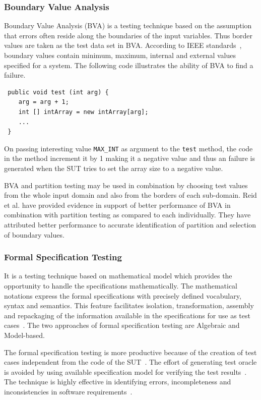 \subsubsection{Boundary Value Analysis}
Boundary Value Analysis (BVA) is a testing technique based on the assumption that errors often reside along the boundaries of the input variables. Thus border values are taken as the test data set in BVA. According to IEEE standards~\cite{radatz1990ieee}, boundary values contain minimum, maximum, internal and external values specified for a system.
The following code illustrates the ability of BVA to find a failure. 
\bigskip
\begin{lstlisting}
 public void test (int arg) {
	arg = arg + 1;
	int [] intArray = new intArray[arg];
	...
 }
\end{lstlisting}
\bigskip
On passing interesting value \verb+MAX_INT+ as argument to the \verb+test+ method, the code in the method increment it by 1 making it a negative value and thus an failure is generated when the SUT tries to set the array size to a negative value.

BVA and partition testing may be used in combination by choosing test values from the whole input domain and also from the borders of each sub-domain. Reid et al. \cite{reid1997empirical} have provided evidence in support of better performance of BVA in combination with partition testing as compared to each individually. They have attributed better performance to accurate identification of partition and selection of boundary values. 


\subsubsection{Formal Specification Testing}
It is a testing technique based on mathematical model which provides the opportunity to handle the specifications mathematically. The mathematical notations express the formal specifications with precisely defined vocabulary, syntax and semantics. This feature facilitates isolation, transformation, assembly and repackaging of the information available in the specifications for use as test cases~\cite{donat1997automating}. The two approaches of formal specification testing are Algebraic and Model-based.

The formal specification testing is more productive because of the creation of test cases independent from the code of the SUT~\cite{gaudel2010software}. The effort of generating test oracle is avoided by using available specification model for verifying the test results~\cite{bertolino2007software}. The technique is highly effective in identifying errors, incompleteness and inconsistencies in software requirements~\cite{sommerville2013software}.
  

